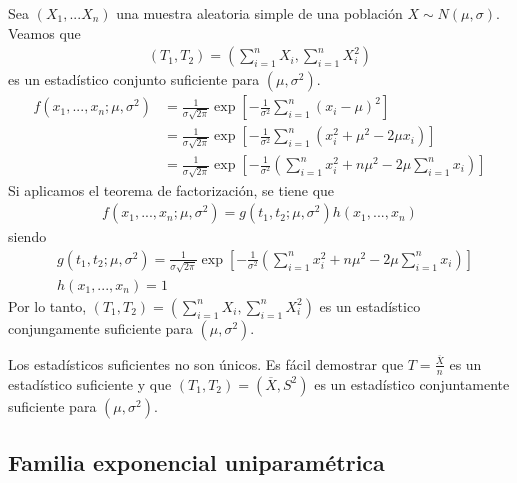 \begin{ejemplo}
    Sea $(X_1,...X_n)$ una muestra aleatoria simple de una población $X \sim N(\mu,\sigma)$. Veamos que
    \begin{align*}
        (T_1,T_2) = \left( \sum_{i=1}^{n}{X_i}, \sum_{i=1}^{n}{X_i^2}\right)
    \end{align*}
    es un estadístico conjunto suficiente para $(\mu,\sigma^2)$.
    \begin{align*}
        f(x_1,...,x_n;\mu,\sigma^2) & = \frac{1}{\sigma\sqrt{2\pi}}\exp\left[ -\frac{1}{\sigma^2}\sum_{i=1}^{n}{(x_i - \mu)^2}\right]                                         \\
                                    & = \frac{1}{\sigma\sqrt{2\pi}}\exp\left[ -\frac{1}{\sigma^2}\sum_{i=1}^{n}{(x_i^2 + \mu^2 - 2\mu x_i)}\right]                            \\
                                    & = \frac{1}{\sigma\sqrt{2\pi}}\exp\left[ -\frac{1}{\sigma^2}\left(\sum_{i=1}^{n}{x_i^2} + n\mu^2 - 2\mu\sum_{i=1}^{n}{x_i}\right)\right]
    \end{align*}
    Si aplicamos el teorema de factorización, se tiene que
    \begin{align*}
        f(x_1,...,x_n;\mu,\sigma^2) = g(t_1,t_2;\mu,\sigma^2)h(x_1,...,x_n)
    \end{align*}
    siendo
    \begin{align*}
         & g(t_1,t_2;\mu,\sigma^2) = \frac{1}{\sigma\sqrt{2\pi}}\exp\left[ -\frac{1}{\sigma^2}\left(\sum_{i=1}^{n}{x_i^2} + n\mu^2 - 2\mu\sum_{i=1}^{n}{x_i}\right)\right] \\
         & h(x_1,...,x_n) = 1
    \end{align*}
    Por lo tanto, $(T_1,T_2) = \left( \sum_{i=1}^{n}{X_i}, \sum_{i=1}^{n}{X_i^2}\right)$ es un estadístico conjungamente suficiente para $(\mu,\sigma^2)$.
\end{ejemplo}

\begin{obs}
    Los estadísticos suficientes no son únicos. Es fácil demostrar que $T = \frac{\overline{X}}{n}$ es un estadístico suficiente y que $(T_1,T_2) = (\overline{X},  S^2)$ es un estadístico conjuntamente suficiente para $(\mu,\sigma^2)$.
\end{obs}

\subsection{Familia exponencial uniparamétrica}

